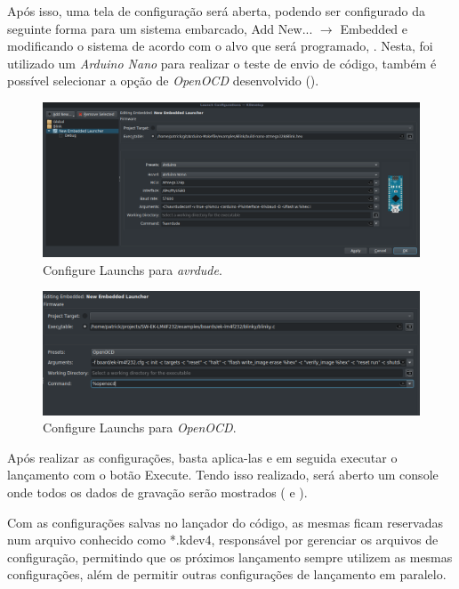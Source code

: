 Após isso, uma tela de configuração será aberta, podendo ser configurado da seguinte forma para um sistema embarcado, Add New... $\rightarrow$ Embedded e modificando o sistema de acordo com o alvo que será programado, . Nesta, foi utilizado um \textit{Arduino Nano} para realizar o teste de envio de código, também é possível selecionar a opção de \textit{OpenOCD} desenvolvido ().

\begin{figure}[!htb]
  \centering
  \caption[\textit{Configure Launchs} para \textit{avrdude}]{Configure Launchs para \textit{avrdude}.}
  \label{fig:run2}
  \includegraphics[width=1\textwidth]{figuras/run2.png}
\end{figure}

\begin{figure}[!htb]
  \centering
  \caption[\textit{Configure Launchs} para \textit{OpenOCD}]{Configure Launchs para \textit{OpenOCD}.}
  \label{fig:openocd}
  \includegraphics[width=1\textwidth]{figuras/openocd.png}
\end{figure}

Após realizar as configurações, basta aplica-las e em seguida executar o lançamento com o botão Execute. Tendo isso realizado, será aberto um console onde todos os dados de gravação serão mostrados ( e ).

Com as configurações salvas no lançador do código, as mesmas ficam reservadas num arquivo conhecido como *.kdev4, responsável por gerenciar os arquivos de configuração, permitindo que os próximos lançamento sempre utilizem as mesmas configurações, além de permitir outras configurações de lançamento em paralelo.

